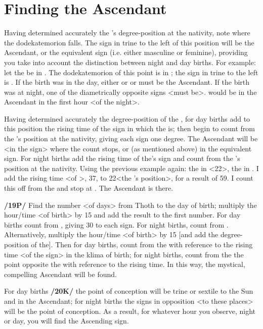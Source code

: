 \section{Finding the Ascendant}

Having determined accurately the \Sun’s degree-position at the nativity, note where the dodekatemorion falls. The sign in trine to the left of this position will be the Ascendant, or the equivalent sign (i.e. either masculine or feminine), providing you take into account the distinction between night and day births. For example: let the \Sun\xspace be in \Aquarius\xspace 22\deg. The dodekatemorion of this point is in \Scorpio; the sign in trine to the left is \Pisces. If the birth was in the day, either \Pisces\xspace or \Taurus\xspace or \Cancer\xspace must be the Ascendant. If the birth was at night, one of the diametrically opposite signs <must be>. \Virgo\xspace would be in the Ascendant in the first hour <of the night>.

Having determined accurately the degree-position of the \Sun, for day births add to this position the rising time of the sign in which the \Sun\xspace is; then begin to count from the \Moon’s position at the nativity, giving each sign one degree. The Ascendant will be <in the sign> where the count stops, or (as mentioned above) in the equivalent sign. For night births add the rising time of the\Moon’s sign and count from the \Sun’s position at the nativity. Using the previous example again: the \Sun in \Aquarius\xspace <22\deg>, the \Moon\xspace in
\Scorpio. I add the rising time <of \Scorpio>, 37, to 22\deg <the \Sun’s position>, for a result of 59. I count this off from the \Sun\xspace and stop at \Virgo. The Ascendant is there.

\textbf{/19P/} Find the number <of days> from Thoth to the day of birth; multiply the hour/time <of birth> by 15 and add the result to the first number. For day births count from \Virgo, giving 30 to each sign. For night births, count from \Pisces.
Alternatively, multiply the hour/time <of birth> by 15 [and add the degree-position of the\Sun]. Then for day births, count from the \Sun\xspace with reference to the rising time <of the sign> in the klima of birth; for night births, count from the the point opposite the \Sun\xspace with reference to the rising time. In this way, the mystical, compelling Ascendant will be found. 

For day births \textbf{/20K/} the point of conception will be trine or sextile to the Sun and in the Ascendant; for night births the signs in opposition <to these places> will be the point of conception. As a result, for whatever hour you observe, night or day, you will find the Ascending sign.

